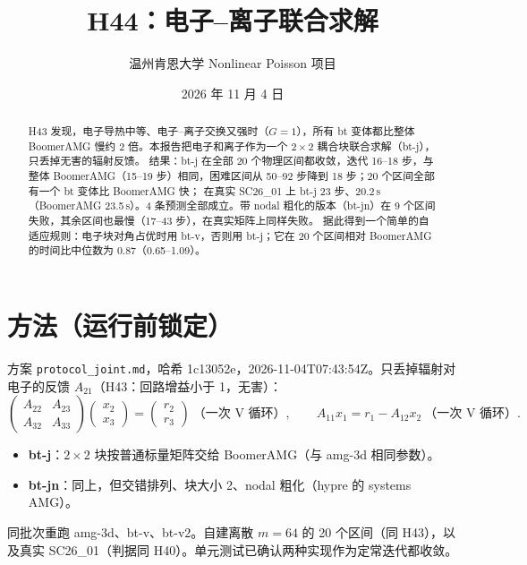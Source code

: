 \documentclass[11pt,a4paper]{ctexart}
\title{H44：电子--离子联合求解}
\author{温州肯恩大学 \quad Nonlinear Poisson 项目}
\date{2026 年 11 月 4 日}
\begin{document}
\maketitle

\begin{abstract}
H43 发现，电子导热中等、电子--离子交换又强时（$G=1$），所有 bt 变体都比整体 BoomerAMG 慢约 2 倍。本报告把电子和离子作为一个 $2\times2$ 耦合块联合求解（bt-j），只丢掉无害的辐射反馈。
结果：bt-j 在全部 20 个物理区间都收敛，迭代 16--18 步，与整体 BoomerAMG（15--19 步）相同，困难区间从 50--92 步降到 18 步；20 个区间全部有一个 bt 变体比 BoomerAMG 快；
在真实 SC26\_01 上 bt-j 23 步、20.2\,s（BoomerAMG 23.5\,s）。4 条预测全部成立。带 nodal 粗化的版本（bt-jn）在 9 个区间失败，其余区间也最慢（17--43 步），在真实矩阵上同样失败。
据此得到一个简单的自适应规则：电子块对角占优时用 bt-v，否则用 bt-j；它在 20 个区间相对 BoomerAMG 的时间比中位数为 0.87（0.65--1.09）。
\end{abstract}

\section{方法（运行前锁定）}
方案 \texttt{protocol\_joint.md}，哈希 1c13052e，2026-11-04T07:43:54Z。只丢掉辐射对电子的反馈 $A_{21}$（H43：回路增益小于 1，无害）：
\[
\begin{pmatrix}A_{22}&A_{23}\\A_{32}&A_{33}\end{pmatrix}\begin{pmatrix}x_2\\x_3\end{pmatrix}=\begin{pmatrix}r_2\\r_3\end{pmatrix}\ \text{（一次 V 循环）},\qquad A_{11}x_1=r_1-A_{12}x_2\ \text{（一次 V 循环）}.
\]
\begin{itemize}
\item \textbf{bt-j}：$2\times2$ 块按普通标量矩阵交给 BoomerAMG（与 amg-3d 相同参数）。
\item \textbf{bt-jn}：同上，但交错排列、块大小 2、nodal 粗化（hypre 的 systems AMG）。
\end{itemize}
同批次重跑 amg-3d、bt-v、bt-v2。自建离散 $m=64$ 的 20 个区间（同 H43），以及真实 SC26\_01（判据同 H40）。单元测试已确认两种实现作为定常迭代都收敛。
\end{document}

